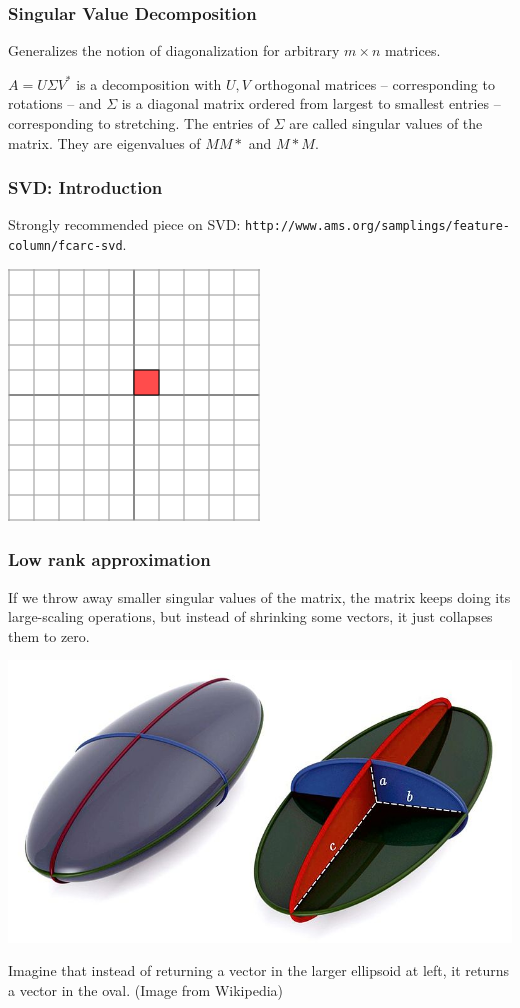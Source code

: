 \documentclass[12pt]{beamer}
\theoremstyle{definition}
\begin{document}
\begin{frame}
\frametitle{Singular Value Decomposition}
Generalizes the notion of diagonalization for arbitrary
$m \times n$ matrices.

$A = U \Sigma V^*$ is a decomposition with $U,V$
orthogonal matrices -- corresponding to rotations --
and $\Sigma$ is a diagonal matrix ordered from largest to smallest
entries -- corresponding to stretching. The entries of $\Sigma$ are
called singular values of the matrix. They are eigenvalues of $MM*$ and
$M*M$.

\end{frame}

\begin{frame}
\frametitle{SVD: Introduction}
Strongly recommended piece on SVD: {\tt http://www.ams.org/samplings/feature-column/fcarc-svd}.

\includegraphics{svd1.gif}
\end{frame}

\begin{frame}
\frametitle{Low rank approximation}
If we throw away smaller singular values of the matrix, 
the matrix keeps doing its large-scaling operations, but instead
of shrinking some vectors, it just collapses them to zero.

\centerline{\includegraphics{ellipsoid.jpg}}

Imagine that instead of returning a vector in the larger ellipsoid at left,
it returns a vector in the oval. (Image from Wikipedia)
\end{frame}
\end{document}
